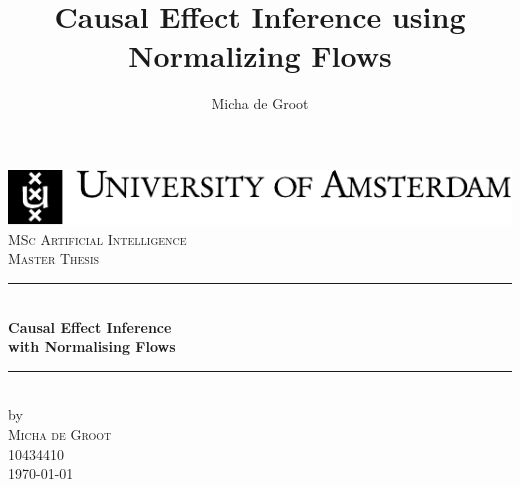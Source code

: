 \documentclass{report}
\title{Causal Effect Inference using Normalizing Flows}
\author{Micha de Groot}
\newcommand{\red}[1]{{\color{red}{#1}}}
\begin{document}
\begin{titlepage}

\newcommand{\HRule}{\rule{\linewidth}{0.5mm}} %
\center %
 

\includegraphics[width=\linewidth]{uvaENG}\\[2.5cm]
\textsc{\Large MSc Artificial Intelligence}\\[0.2cm]
\textsc{\Large Master Thesis}\\[0.5cm] 


\HRule \\[0.4cm]
{ \huge \bfseries Causal Effect Inference\\ with Normalising Flows}\\[0.4cm] %
\HRule \\[0.5cm]
 

by\\[0.2cm]
\textsc{\Large Micha de Groot}\\[0.2cm] %
10434410\\[1cm]



{\Large \today}\\[1cm] %


\end{titlepage}
\end{document}
